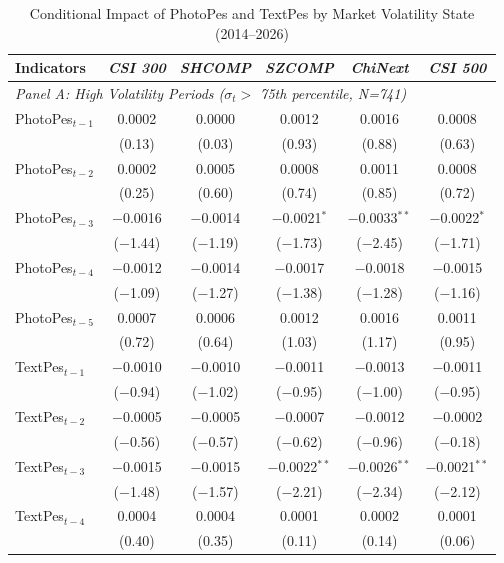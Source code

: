 \documentclass[AER]{AEA}
\begin{document}
\begin{table}[p]
    \centering
    \caption{Conditional Impact of PhotoPes and TextPes by Market Volatility State (2014--2026)}
    \label{tab:sentiment_significant_periods}
    \setlength{\tabcolsep}{3pt}
    \footnotesize
    \begin{tabular}{lccccc}
    \toprule
    Indicators & \textit{CSI 300} & \textit{SHCOMP} & \textit{SZCOMP} & \textit{ChiNext} & \textit{CSI 500} \\
    \midrule
    \multicolumn{6}{l}{\textit{Panel A: High Volatility Periods ($\sigma_t >$ 75th percentile, N=741)}} \\
    \midrule
    PhotoPes$_{t-1}$ & 0.0002 & 0.0000 & 0.0012 & 0.0016 & 0.0008 \\
     & (0.13) & (0.03) & (0.93) & (0.88) & (0.63) \\
    PhotoPes$_{t-2}$ & 0.0002 & 0.0005 & 0.0008 & 0.0011 & 0.0008 \\
     & (0.25) & (0.60) & (0.74) & (0.85) & (0.72) \\
    PhotoPes$_{t-3}$ & $-$0.0016 & $-$0.0014 & $-$0.0021$^{*}$ & $-$0.0033$^{**}$ & $-$0.0022$^{*}$ \\
     & ($-$1.44) & ($-$1.19) & ($-$1.73) & ($-$2.45) & ($-$1.71) \\
    PhotoPes$_{t-4}$ & $-$0.0012 & $-$0.0014 & $-$0.0017 & $-$0.0018 & $-$0.0015 \\
     & ($-$1.09) & ($-$1.27) & ($-$1.38) & ($-$1.28) & ($-$1.16) \\
    PhotoPes$_{t-5}$ & 0.0007 & 0.0006 & 0.0012 & 0.0016 & 0.0011 \\
     & (0.72) & (0.64) & (1.03) & (1.17) & (0.95) \\
    \midrule
    TextPes$_{t-1}$ & $-$0.0010 & $-$0.0010 & $-$0.0011 & $-$0.0013 & $-$0.0011 \\
     & ($-$0.94) & ($-$1.02) & ($-$0.95) & ($-$1.00) & ($-$0.95) \\
    TextPes$_{t-2}$ & $-$0.0005 & $-$0.0005 & $-$0.0007 & $-$0.0012 & $-$0.0002 \\
     & ($-$0.56) & ($-$0.57) & ($-$0.62) & ($-$0.96) & ($-$0.18) \\
    TextPes$_{t-3}$ & $-$0.0015 & $-$0.0015 & $-$0.0022$^{**}$ & $-$0.0026$^{**}$ & $-$0.0021$^{**}$ \\
     & ($-$1.48) & ($-$1.57) & ($-$2.21) & ($-$2.34) & ($-$2.12) \\
    TextPes$_{t-4}$ & 0.0004 & 0.0004 & 0.0001 & 0.0002 & 0.0001 \\
     & (0.40) & (0.35) & (0.11) & (0.14) & (0.06) \\

\end{tabular}
\end{table}
\end{document}
